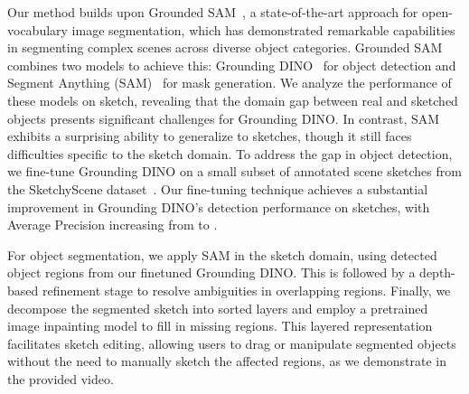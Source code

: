 Our method builds upon Grounded SAM~\cite{ren2024grounded}, a state-of-the-art approach for open-vocabulary image segmentation, which has demonstrated remarkable capabilities in segmenting complex scenes across diverse object categories. Grounded SAM combines two models to achieve this: Grounding DINO~\cite{liu2023grounding} for object detection and Segment Anything (SAM)~\cite{kirillov2023segany} for mask generation. We analyze the performance of these models on sketch, revealing that the domain gap between real and sketched objects presents significant challenges for Grounding DINO. In contrast, SAM exhibits a surprising ability to generalize to sketches, though it still faces difficulties specific to the sketch domain.
To address the gap in object detection, we fine-tune Grounding DINO on
a small subset of annotated scene sketches from the SketchyScene
dataset~.
Our fine-tuning technique achieves a substantial improvement in Grounding DINO's detection performance on sketches, with Average Precision increasing from  to .

For object segmentation, we apply SAM \cite{kirillov2023segany} in the sketch domain, using detected object regions from our finetuned Grounding DINO. This is followed by a depth-based refinement stage to resolve ambiguities in overlapping regions.
Finally, we decompose the segmented sketch into sorted layers and employ a pretrained image inpainting model  to fill in missing regions. This layered representation facilitates sketch editing, allowing users to drag or manipulate segmented objects without the need to manually sketch the affected regions, as we demonstrate in the provided video.


